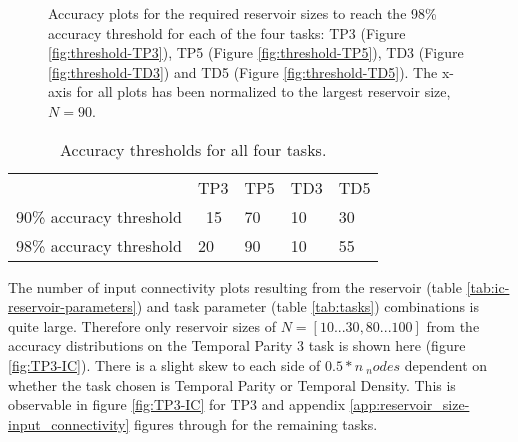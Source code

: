 \begin{figure}[ht]
    \centering
    \caption{
        Accuracy plots for the required reservoir sizes to reach the 98\% accuracy threshold for each of the four tasks:
        TP3 (Figure \ref{fig:threshold-TP3}), TP5 (Figure \ref{fig:threshold-TP5}), TD3 (Figure \ref{fig:threshold-TD3}) and TD5 (Figure \ref{fig:threshold-TD5}).
        The x-axis for all plots has been normalized to the largest reservoir size, $N=90$.
    }
    \label{fig:accuracy-threshold-size}
    \resizebox{\textwidth}{!}{
        \subfloat[TP3, N=20]{
            
            \label{fig:threshold-TP3}
        }
        \subfloat[TP5, N=90]{
            
            \label{fig:threshold-TP5}
        }
    }
    \resizebox{\textwidth}{!}{
        \subfloat[TD3, N=10]{
            
            \label{fig:threshold-TD3}
        }
        \subfloat[TD5, N=55]{
            
            \label{fig:threshold-TD5}
        }
    }
\end{figure}

\begin{table}[ht]
    \centering
    \caption{Accuracy thresholds for all four tasks.}
    \label{tab:accuracy-thresholds}
    \begin{tabular}{lllll}
                            & TP3 & TP5 & TD3 & TD5 \\
    90\% accuracy threshold & ~15 & 70  & 10  & 30  \\
    98\% accuracy threshold & 20  & 90  & 10  & 55
    \end{tabular}
\end{table}

The number of input connectivity plots resulting from the reservoir (table \ref{tab:ic-reservoir-parameters}) and task parameter (table \ref{tab:tasks}) combinations is quite large.
Therefore only reservoir sizes of $ N=[10...30, 80...100]$ from the accuracy distributions on the Temporal Parity 3 task is shown here (figure \ref{fig:TP3-IC}).
There is a slight skew to each side of $ 0.5 * n\ _nodes $ dependent on whether the task chosen is Temporal Parity or Temporal Density.
This is observable in figure \ref{fig:TP3-IC} for TP3 and appendix \ref{app:reservoir_size-input_connectivity} figures \label{fig:TP3-IC-1} through \label{fig:TD5-IC-2} for the remaining tasks.

